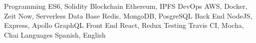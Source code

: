 


\begin{cvskills}

\cvskill
{Programming} %
{ES6, Solidity} %
\cvskill
{Blockchain} %
{Ethereum, IPFS} %
\cvskill
{DevOps} %
{AWS, Docker, Zeit Now, Serverless} %
\cvskill
{Data Base} %
{Redis, MongoDB, PosgreSQL} %
\cvskill
{Back End} %
{NodeJS, Express, Apollo GraphQL} %
\cvskill
{Front End} %
{React, Redux} %
\cvskill
{Testing} %
{Travis CI, Mocha, Chai} %
\cvskill
{Languages} %
{Spanish, English} %
\end{cvskills}
